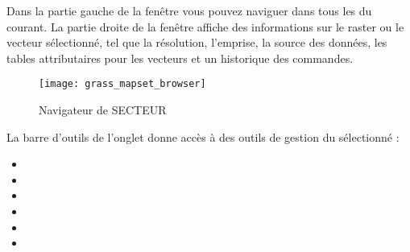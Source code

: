 Dans la partie gauche de la fenêtre vous pouvez naviguer dans tous les  du  courant. La partie droite de la fenêtre affiche des informations sur le raster ou le vecteur sélectionné, tel que la résolution, l'emprise, la source des données, les tables attributaires pour les vecteurs et un historique des commandes.

\begin{figure}[ht]
 \begin{center}
 
 \texttt{[image: grass\_mapset\_browser]}
 \caption{Navigateur de SECTEUR \grass \nixcaption}\label{fig:grass_mapset_browser}
 \end{center}
\end{figure}

La barre d'outils de l'onglet  donne accès à des outils de gestion du  sélectionné :

\begin{itemize}[label=--]
\item {}
\item {}
\item {}
\item {}
\item {}
\item {}
\end{itemize}

